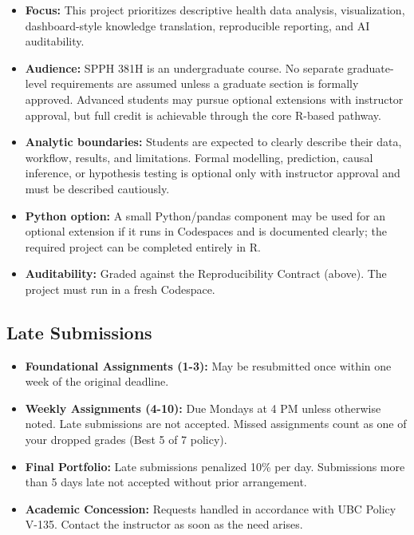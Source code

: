 \documentclass[
  letterpaper,
  DIV=11,
  numbers=noendperiod,
  oneside]{scrreprt}
\providecommand{\tightlist}{%
  \setlength{\itemsep}{0pt}\setlength{\parskip}{0pt}}
\begin{document}
\begin{itemize}
\tightlist
\item
  \textbf{Focus:} This project prioritizes descriptive health data
  analysis, visualization, dashboard-style knowledge translation,
  reproducible reporting, and AI auditability.
\item
  \textbf{Audience:} SPPH 381H is an undergraduate course. No separate
  graduate-level requirements are assumed unless a graduate section is
  formally approved. Advanced students may pursue optional extensions
  with instructor approval, but full credit is achievable through the
  core R-based pathway.
\item
  \textbf{Analytic boundaries:} Students are expected to clearly
  describe their data, workflow, results, and limitations. Formal
  modelling, prediction, causal inference, or hypothesis testing is
  optional only with instructor approval and must be described
  cautiously.
\item
  \textbf{Python option:} A small Python/pandas component may be used
  for an optional extension if it runs in Codespaces and is documented
  clearly; the required project can be completed entirely in R.
\item
  \textbf{Auditability:} Graded against the Reproducibility Contract
  (above). The project must run in a fresh Codespace.
\end{itemize}

\subsection{Late Submissions}\label{late-submissions}

\begin{itemize}
\tightlist
\item
  \textbf{Foundational Assignments (1-3):} May be resubmitted once
  within one week of the original deadline.
\item
  \textbf{Weekly Assignments (4-10):} Due Mondays at 4 PM unless
  otherwise noted. Late submissions are not accepted. Missed assignments
  count as one of your dropped grades (Best 5 of 7 policy).
\item
  \textbf{Final Portfolio:} Late submissions penalized 10\% per day.
  Submissions more than 5 days late not accepted without prior
  arrangement.
\item
  \textbf{Academic Concession:} Requests handled in accordance with UBC
  Policy V-135. Contact the instructor as soon as the need arises.
\end{itemize}
\end{document}
